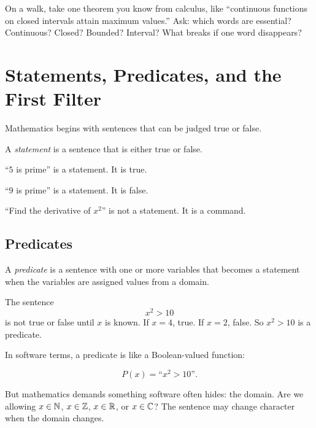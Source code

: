 \documentclass[11pt]{article}
\begin{document}
\begin{walkbox}
On a walk, take one theorem you know from calculus, like ``continuous functions on closed intervals attain maximum values.'' Ask: which words are essential? Continuous? Closed? Bounded? Interval? What breaks if one word disappears?
\end{walkbox}

\newpage
\section{Statements, Predicates, and the First Filter}

Mathematics begins with sentences that can be judged true or false.

\begin{definition}
A \emph{statement} is a sentence that is either true or false.
\end{definition}

\begin{example}
``$5$ is prime'' is a statement. It is true.
\end{example}

\begin{example}
``$9$ is prime'' is a statement. It is false.
\end{example}

\begin{example}
``Find the derivative of $x^2$'' is not a statement. It is a command.
\end{example}

\subsection{Predicates}

\begin{definition}
A \emph{predicate} is a sentence with one or more variables that becomes a statement when the variables are assigned values from a domain.
\end{definition}

The sentence
\[
x^2>10
\]
is not true or false until $x$ is known. If $x=4$, true. If $x=2$, false. So $x^2>10$ is a predicate.

In software terms, a predicate is like a Boolean-valued function:

\[
P(x)=\text{``}x^2>10\text{''}.
\]

But mathematics demands something software often hides: the domain. Are we allowing $x\in\mathbb{N}$, $x\in\mathbb{Z}$, $x\in\mathbb{R}$, or $x\in\mathbb{C}$? The sentence may change character when the domain changes.
\end{document}
